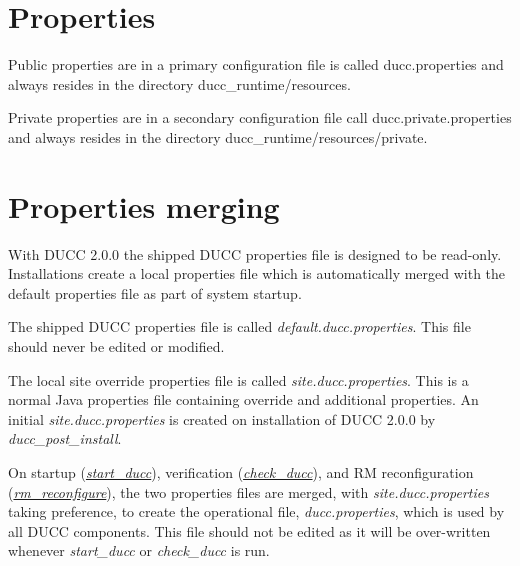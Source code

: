 % 
% 
% 
% 

\section{Properties}
 	
 	Public properties are in a primary configuration file is called ducc.properties 
	and always resides in the directory
    ducc\_runtime/resources.

	Private properties are in a secondary configuration file call ducc.private.properties
	and always resides in the directory
    ducc\_runtime/resources/private.

\section{Properties merging}
\label{sec:admin.properties-merge}
    
    With DUCC 2.0.0 the shipped DUCC properties file is designed to be read-only.  Installations
    create a local properties file which is automatically merged with the default properties file
    as part of system startup.

    The shipped DUCC properties file is called {\em default.ducc.properties}.  This file should
    never be edited or modified.

    The local site override properties file is called {\em site.ducc.properties}.  This is a 
    normal Java properties file containing override and additional properties.  An initial
    {\em site.ducc.properties} is created on installation of DUCC 2.0.0 by {\em ducc\_post\_install}.

    On startup 
    (\hyperref[subsec:admin.start-ducc]{\em start\_ducc}), 
    verification 
    (\hyperref[subsec:admin.check-ducc]{\em check\_ducc}),     
    and RM reconfiguration
    (\hyperref[subsec:admin.rm-reconfigure]{\em rm\_reconfigure}),     
    the two properties files are
    merged, with {\em site.ducc.properties} taking preference, to create the operational file,
    {\em ducc.properties}, which is used by all DUCC components.  This file should not be
    edited as it will be over-written whenever {\em start\_ducc} or {\em check\_ducc} is run.

